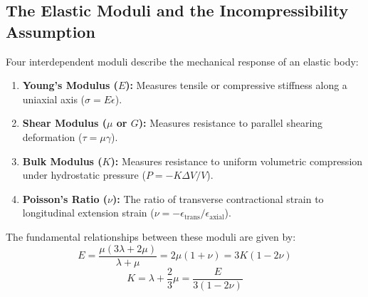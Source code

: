 \documentclass[11pt,a4paper]{article}
\begin{document}
\subsection{The Elastic Moduli and the Incompressibility Assumption}
Four interdependent moduli describe the mechanical response of an elastic body:
\begin{enumerate}
    \item \textbf{Young's Modulus ($E$):} Measures tensile or compressive stiffness along a uniaxial axis ($\sigma = E \epsilon$).
    \item \textbf{Shear Modulus ($\mu$ or $G$):} Measures resistance to parallel shearing deformation ($\tau = \mu \gamma$).
    \item \textbf{Bulk Modulus ($K$):} Measures resistance to uniform volumetric compression under hydrostatic pressure ($P = -K \Delta V / V$).
    \item \textbf{Poisson's Ratio ($\nu$):} The ratio of transverse contractional strain to longitudinal extension strain ($\nu = -\epsilon_{\text{trans}} / \epsilon_{\text{axial}}$).
\end{enumerate}

The fundamental relationships between these moduli are given by:
\begin{equation}
    E = \frac{\mu(3\lambda + 2\mu)}{\lambda + \mu} = 2\mu(1 + \nu) = 3K(1 - 2\nu)
\end{equation}
\begin{equation}
    K = \lambda + \frac{2}{3}\mu = \frac{E}{3(1 - 2\nu)}
\end{equation}
\end{document}
